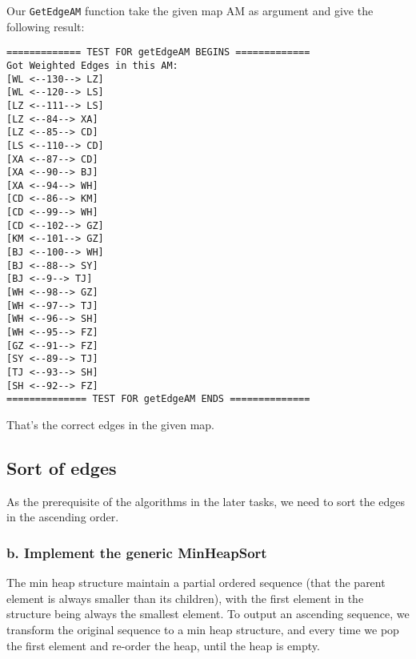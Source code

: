 Our \verb|GetEdgeAM| function take the given map AM as argument and give the following result:
\begin{verbatim}
============= TEST FOR getEdgeAM BEGINS =============
Got Weighted Edges in this AM:
[WL <--130--> LZ]
[WL <--120--> LS]
[LZ <--111--> LS]
[LZ <--84--> XA]
[LZ <--85--> CD]
[LS <--110--> CD]
[XA <--87--> CD]
[XA <--90--> BJ]
[XA <--94--> WH]
[CD <--86--> KM]
[CD <--99--> WH]
[CD <--102--> GZ]
[KM <--101--> GZ]
[BJ <--100--> WH]
[BJ <--88--> SY]
[BJ <--9--> TJ]
[WH <--98--> GZ]
[WH <--97--> TJ]
[WH <--96--> SH]
[WH <--95--> FZ]
[GZ <--91--> FZ]
[SY <--89--> TJ]
[TJ <--93--> SH]
[SH <--92--> FZ]
============== TEST FOR getEdgeAM ENDS ==============
\end{verbatim}

That's the correct edges in the given map.

\subsection{Sort of edges}

As the prerequisite of the algorithms in the later tasks, we need to sort the edges in the ascending order.

\subsubsection*{b. Implement the generic \textbf{MinHeapSort}}

The min heap structure maintain a partial ordered sequence (that the parent element is always smaller than its children), with the first element in the structure being always the smallest element. To output an ascending sequence, we transform the original sequence to a min heap structure, and every time we pop the first element and re-order the heap, until the heap is empty.

